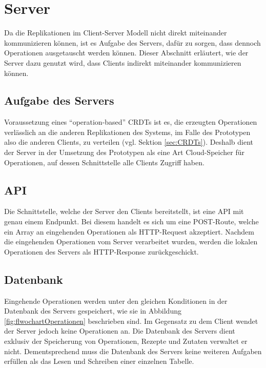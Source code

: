 \documentclass[a4paper, 12pt]{scrreprt}
\begin{document}
\section{Server}

Da die Replikationen im Client-Server Modell nicht direkt miteinander kommunizieren können, ist es Aufgabe des Servers, dafür zu sorgen, dass dennoch Operationen ausgetauscht werden können. Dieser Abschnitt erläutert, wie der Server dazu genutzt wird, dass Clients indirekt miteinander kommunizieren können. 

\subsection{Aufgabe des Servers}
\label{sec:AufgabeServer}

Voraussetzung eines \enquote{operation-based} \acp{CRDT} ist es, die erzeugten Operationen verlässlich an die anderen Replikationen des Systems, im Falle des Prototypen also die anderen Clients, zu verteilen (vgl. Sektion \ref{sec:CRDTs}). Deshalb dient der Server in der Umsetzung des Prototypen als eine Art Cloud-Speicher für Operationen, auf dessen Schnittstelle alle Clients Zugriff haben. 

\subsection{API}

Die Schnittstelle, welche der Server den Clients bereitstellt, ist eine API mit genau einem Endpunkt. Bei diesem handelt es sich um eine POST-Route, welche ein Array an eingehenden Operationen als HTTP-Request akzeptiert. Nachdem die eingehenden Operationen vom Server verarbeitet wurden, werden die lokalen Operationen des Servers als HTTP-Response zurückgeschickt. 

\subsection{Datenbank}

Eingehende Operationen werden unter den gleichen Konditionen in der Datenbank des Servers gespeichert, wie sie in Abbildung \ref{fig:flwochartOperationen} beschrieben sind. Im Gegensatz zu dem Client wendet der Server jedoch keine Operationen an. Die Datenbank des Servers dient exklusiv der Speicherung von Operationen, Rezepte und Zutaten verwaltet er nicht. Dementsprechend muss die Datenbank des Servers keine weiteren Aufgaben erfüllen als das Lesen und Schreiben einer einzelnen Tabelle. 
\end{document}
